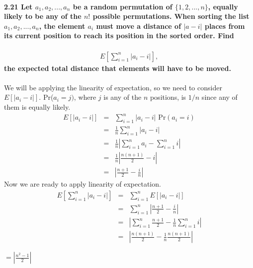 \documentclass{article}
\begin{document}
\paragraph{2.21 Let $a_1, a_2, ..., a_n$ be a random permutation of 
$\{1, 2, ..., n\}$, equally likely to be any of the $n!$ possible permutations. 
When sorting the list $a_1, a_2, ..., a_n$, the element $a_i$ must move a 
distance of $|a-i|$ places from its current position to reach its 
position in the sorted order. Find}
\begin{eqnarray*}
E\left[\sum_{i=1}^n |a_i-i|\right],
\end{eqnarray*}
\textbf{the expected total distance that elements will have to be moved.\\\\}
We will be applying the linearity of expectation, so we need to consider
$E[|a_i-i|]$. Pr($a_i=j)$, where $j$ is any of the $n$ positions, is $1/n$
since any of them is equally likely.
\begin{eqnarray*}
E[|a_i-i|] & = & \sum_{i=1}^n |a_i-i|\mbox{ Pr}(a_i=i)\\
	& = & \frac{1}{n}\sum_{i=1}^n |a_i-i|\\
	& = & \frac{1}{n}\left|\sum_{i=1}^n a_i-\sum_{i=1}^n i\right|\\
	& = & \frac{1}{n}\left|\frac{n(n+1)}{2}-i\right|\\
	& = & \left|\frac{n+1}{2}-\frac{i}{n}\right|
\end{eqnarray*}
Now we are ready to apply linearity of expectation.
\begin{eqnarray*}
E\left[\sum_{i=1}^n |a_i-i|\right] & = & \sum_{i=1}^n E[|a_i-i|]\\
	& = & \sum_{i=1}^n \left|\frac{n+1}{2}-\frac{i}{n}\right|\\
	& = & \left|\sum_{i=1}^n \frac{n+1}{2}-\frac{1}{n}\sum_{i=1}^n i\right|\\
	& = & \left|\frac{n(n+1)}{2}-\frac{1}{n}\frac{n(n+1)}{2}\right|
\end{eqnarray*}
\begin{center}
$\boxed{=\left|\frac{n^2-1}{2}\right|}$
\end{center}
\end{document}
